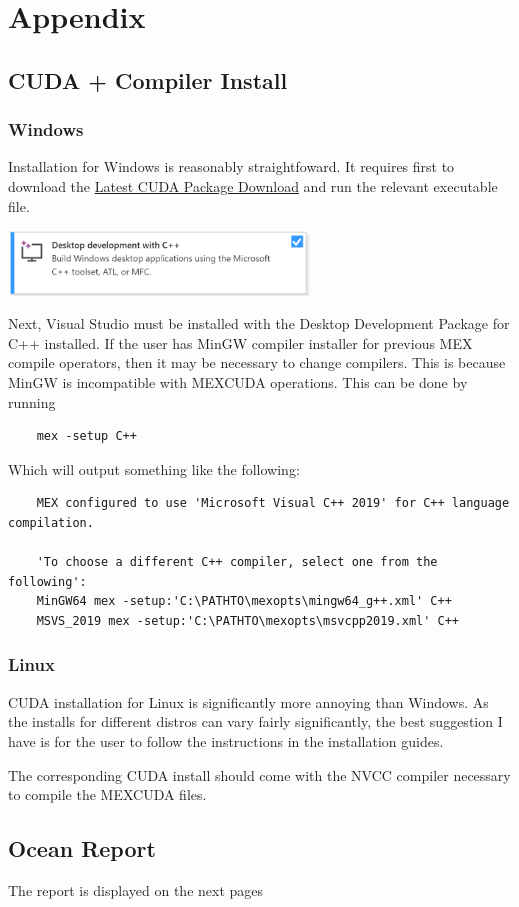 \documentclass[11pt,letterpaper]{article}
\renewcommand{\\}{\bigskip}
\begin{document}
\section{Appendix}

\subsection{CUDA + Compiler Install}

\label{sec:compilerinstall}
\subsubsection{Windows}
Installation for Windows is reasonably straightfoward. It requires first to download the \href{https://developer.nvidia.com/cuda-downloads?target_os=Windows&target_arch=x86_64}{Latest CUDA Package Download} and run the relevant executable file.\\

\begin{center}
    \includegraphics[width = 0.6\textwidth]{Windows_Compiler.png}
\end{center}

Next, Visual Studio must be installed with the Desktop Development Package for C++ installed. If the user has MinGW compiler installer for previous MEX compile operators, then it may be necessary to change compilers. This is because MinGW is incompatible with MEXCUDA operations. This can be done by running

\begin{verbatim}
    mex -setup C++
\end{verbatim}

Which will output something like the following:

\begin{verbatim}
    MEX configured to use 'Microsoft Visual C++ 2019' for C++ language compilation.

    'To choose a different C++ compiler, select one from the following':
    MinGW64 mex -setup:'C:\PATHTO\mexopts\mingw64_g++.xml' C++
    MSVS_2019 mex -setup:'C:\PATHTO\mexopts\msvcpp2019.xml' C++ 
\end{verbatim}


\subsubsection{Linux}
CUDA installation for Linux is significantly more annoying than Windows. As the installs for different distros can vary fairly significantly, the best suggestion I have is for the user to follow the instructions in the installation guides.\\

The corresponding CUDA install should come with the NVCC compiler necessary to compile the MEXCUDA files.


\subsection{Ocean Report}
\label{sec:Oceanreport}
The report is displayed on the next pages

\end{document}
